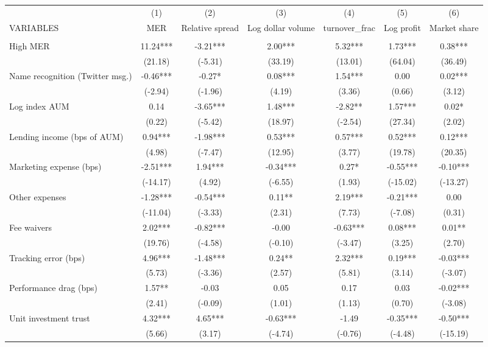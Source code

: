 \documentclass[]{article}
\begin{document}
\begin{tabular}{lcccccc} \hline
 & (1) & (2) & (3) & (4) & (5) & (6) \\
VARIABLES & MER & Relative spread & Log dollar volume & turnover\_frac & Log profit & Market share \\ \hline
 &  &  &  &  &  &  \\
High MER & 11.24*** & -3.21*** & 2.00*** & 5.32*** & 1.73*** & 0.38*** \\
 & (21.18) & (-5.31) & (33.19) & (13.01) & (64.04) & (36.49) \\
Name recognition (Twitter msg.) & -0.46*** & -0.27* & 0.08*** & 1.54*** & 0.00 & 0.02*** \\
 & (-2.94) & (-1.96) & (4.19) & (3.36) & (0.66) & (3.12) \\
Log index AUM & 0.14 & -3.65*** & 1.48*** & -2.82** & 1.57*** & 0.02* \\
 & (0.22) & (-5.42) & (18.97) & (-2.54) & (27.34) & (2.02) \\
Lending income (bps of AUM) & 0.94*** & -1.98*** & 0.53*** & 0.57*** & 0.52*** & 0.12*** \\
 & (4.98) & (-7.47) & (12.95) & (3.77) & (19.78) & (20.35) \\
Marketing expense (bps) & -2.51*** & 1.94*** & -0.34*** & 0.27* & -0.55*** & -0.10*** \\
 & (-14.17) & (4.92) & (-6.55) & (1.93) & (-15.02) & (-13.27) \\
Other expenses & -1.28*** & -0.54*** & 0.11** & 2.19*** & -0.21*** & 0.00 \\
 & (-11.04) & (-3.33) & (2.31) & (7.73) & (-7.08) & (0.31) \\
Fee waivers & 2.02*** & -0.82*** & -0.00 & -0.63*** & 0.08*** & 0.01** \\
 & (19.76) & (-4.58) & (-0.10) & (-3.47) & (3.25) & (2.70) \\
Tracking error (bps) & 4.96*** & -1.48*** & 0.24** & 2.32*** & 0.19*** & -0.03*** \\
 & (5.73) & (-3.36) & (2.57) & (5.81) & (3.14) & (-3.07) \\
Performance drag (bps) & 1.57** & -0.03 & 0.05 & 0.17 & 0.03 & -0.02*** \\
 & (2.41) & (-0.09) & (1.01) & (1.13) & (0.70) & (-3.08) \\
Unit investment trust & 4.32*** & 4.65*** & -0.63*** & -1.49 & -0.35*** & -0.50*** \\
 & (5.66) & (3.17) & (-4.74) & (-0.76) & (-4.48) & (-15.19) \\

\end{tabular}
\end{document}
